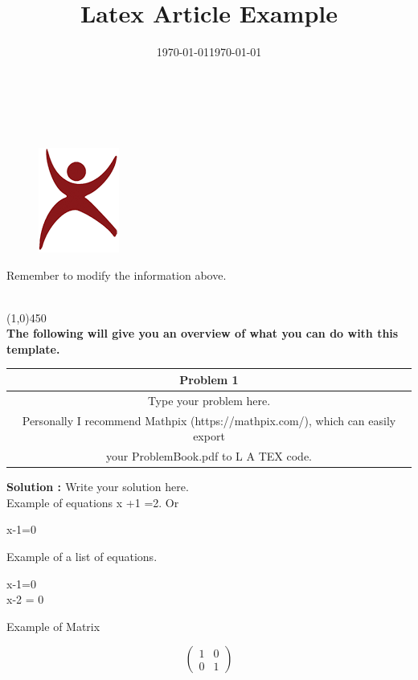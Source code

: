 \documentclass[a4paper,10pt]{article}
\title{\bf{Latex Article Example}}
\author{}
\date{}
\begin{document}
\maketitle
{} \\
 \\

\begin{figure}[h]
\centering
 \includegraphics[scale = 1]{rgukt.png}
\end{figure}

\date{\today}

\pagebreak

\raggedright
{Remember to modify the information above.} 
\date{\today} \\
\line(1,0){450} \\
\textbf{The following will give you an overview of what you can do with this template.}
\begin{table}[h]
    \begin{tabular}{|c|}
    \hline
        {\bf{Problem 1}}\\
    \hline
        {Type your problem here.} \\
{Personally I recommend Mathpix (https://mathpix.com/), which can easily export}\\
{your ProblemBook.pdf to L A TEX code.} \\
    \hline
        
    \end{tabular}

\end{table}

{\bf{Solution : }}
{Write your solution here.}\\
{Example of equations x +1 =2. Or} \\
\begin{center}
    x-1=0
\end{center}

Example of a list of equations.

\begin{center}
    x-1=0 \\
    x-2 = 0
\end{center}
Example of Matrix
\begin{center}
\[
  \begin{pmatrix}
    1 & 0 \\
    0 & 1
  \end{pmatrix}
\]

\end{center}
\end{document}
